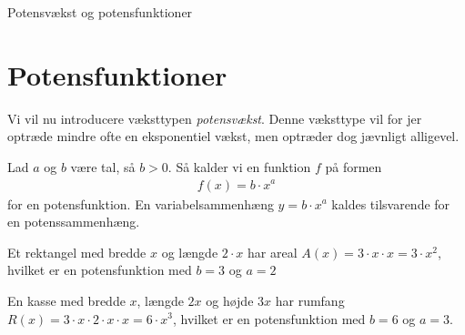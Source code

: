 \begin{center}
\Huge
Potensvækst og potensfunktioner
\end{center}
\section*{Potensfunktioner}

Vi vil nu introducere væksttypen \textit{potensvækst}. Denne væksttype vil for jer optræde mindre ofte en eksponentiel vækst, men optræder dog jævnligt alligevel.
\begin{defn}
Lad $a$ og $b$ være tal, så $b>0$. Så kalder vi en funktion $f$ på formen 
\begin{align*}
f(x) = b\cdot x^a
\end{align*}
for en potensfunktion. En variabelsammenhæng $y=b\cdot x^a$ kaldes tilsvarende for en potenssammenhæng.
\end{defn}

\begin{exa}
Et rektangel med bredde $x$ og længde $2\cdot x$ har areal $A(x) = 3\cdot x\cdot x = 3\cdot x^2$, hvilket er en potensfunktion med $b=3$ og $a=2$
\end{exa}
\begin{exa}
En kasse med bredde $x$, længde $2x$ og højde $3x$ har rumfang $R(x) = 3\cdot x \cdot 2\cdot x\cdot x = 6\cdot x^3$, hvilket er en potensfunktion med $b = 6$ og $a=3$.
\end{exa}

